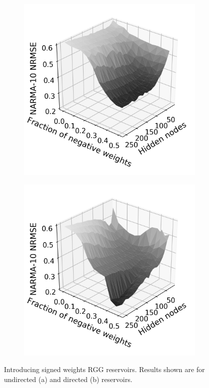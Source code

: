 \begin{figure}[t]
  \centering
  \begin{subfigure}{.49\textwidth}
    \centering
    \includegraphics[width=1.0\linewidth]{figures/perf-rest-undir.png}
    \caption{}
    \label{fig:perf-restore-a}
  \end{subfigure}
  \begin{subfigure}{.49\textwidth}
    \centering
    \includegraphics[width=1.0\linewidth]{figures/perf-rest-dir.png}
    \caption{}
    \label{fig:perf-restore-b}
  \end{subfigure}
  \caption{
    Introducing signed weights RGG reservoirs. Results shown are for undirected
(a) and directed (b) reservoirs.
  }
  \label{fig:perf-restore}
\end{figure}

